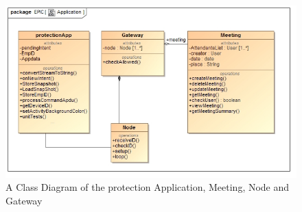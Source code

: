 \documentclass{article}
\begin{document}
		\begin{figure}[H]
 			 \centering
			  \includegraphics[width=12cm]{ApplicationClass}
		 	 \caption{A Class Diagram of the protection Application, Meeting, Node and Gateway}
		\end{figure}
\end{document}
